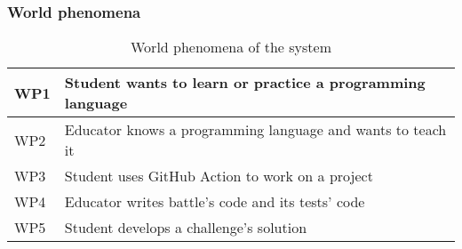 \subsubsection{World phenomena}
\begin{table}[h]
    \centering
    \begin{tabular}{|l|l|}
        \hline
        WP1 & Student wants to learn or practice a programming language \\
        \hline
        WP2 & Educator knows a programming language and wants to teach it \\
        \hline
        WP3 & Student uses GitHub Action to work on a project \\
        \hline
        WP4 & Educator writes battle's code and its tests' code \\
        \hline
        WP5 & Student develops a challenge's solution \\
        \hline
    \end{tabular}
    \caption{World phenomena of the system}
    \label{tab:goals}
\end{table}

\newpage


